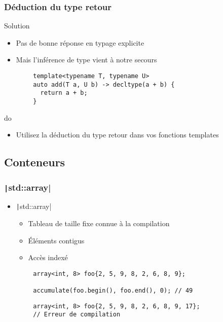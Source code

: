 \documentclass[C++.tex]{subfiles}
\begin{document}
\begin{frame}[fragile]
	\frametitle{Déduction du type retour}
	\begin{block}{Solution}
		\begin{itemize}
			\item Pas de bonne réponse en typage explicite


			\item Mais l'inférence de type vient à notre secours
		\end{itemize}
	\end{block}

	\begin{verbatim}
		template<typename T, typename U>
		auto add(T a, U b) -> decltype(a + b) {
		  return a + b;
		}
	\end{verbatim}

	\begin{exampleblock}{do}
		\begin{itemize}
			\item Utilisez la déduction du type retour dans vos fonctions templates
		\end{itemize}
	\end{exampleblock}
\end{frame}

\subsection*{Conteneurs}
\begin{frame}[fragile]
	\frametitle{\texttt|std::array|}
	\begin{itemize}
		\item \texttt|std::array|
		\begin{itemize}
			\item Tableau de taille fixe connue à la compilation
			\item Éléments contigus
			\item Accès indexé
		\end{itemize}
	\end{itemize}

	\begin{verbatim}
		array<int, 8> foo{2, 5, 9, 8, 2, 6, 8, 9};

		accumulate(foo.begin(), foo.end(), 0); // 49
	\end{verbatim}

	\begin{verbatim}
		array<int, 8> foo{2, 5, 9, 8, 2, 6, 8, 9, 17};
		// Erreur de compilation
	\end{verbatim}
\end{frame}
\end{document}
